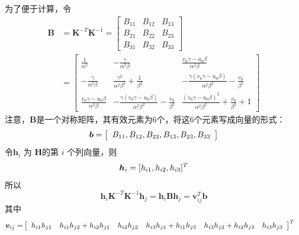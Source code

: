 为了便于计算，令
\begin{equation}
\label{eqn:2.55}
\begin{aligned}
\bm{B} &= \bm{K}^{-T}\bm{K}^{-1}
=\left[
\begin{array}{ccc}
B_{11} & B_{12} & B_{13} \\
B_{21} & B_{22} & B_{23} \\
B_{31} & B_{32} & B_{33}
\end{array}
\right]  \\
&=\left[
\begin{array}{ccc}
\frac{1}{\alpha^2} & -\frac{\gamma}{\alpha^2\beta} & \frac{v_0\gamma-u_0\beta}{\alpha^2\beta} \\
-\frac{\gamma}{\alpha^2\beta} & \frac{\gamma^2}{\alpha^2\beta^2}+\frac{1}{\beta^2} & -\frac{\gamma(v_0\gamma-u_0\beta)}{\alpha^2\beta^2}-\frac{v_0}{\beta^2} \\
\frac{v_0\gamma-u_0\beta}{\alpha^2\beta} & -\frac{\gamma(v_0\gamma-u_0\beta)}{\alpha^2\beta^2}-\frac{v_0}{\beta^2} & \frac{(v_0\gamma-u_0\beta)^2}{\alpha^2\beta^2}+\frac{v_0}{\beta^2}+1
\end{array}
\right]
\end{aligned}
\end{equation}
注意，$\bm{B}$是一个对称矩阵，其有效元素为6个，将这6个元素写成向量的形式：
\begin{equation}
\label{eqn:2.56}
\setlength{\abovedisplayskip}{6pt}
\setlength{\belowdisplayskip}{6pt}
\bm{b} =\left[\begin{array}{ccc}B_{11} ,B_{12} , B_{22},B_{13},B_{23},B_{33}\end{array}\right]
\end{equation}
令$\bm{h}_i $ 为 $\bm{H} $的第 $i$  个列向量，则 
\begin{equation}
\label{eqn:2.57}
\setlength{\abovedisplayskip}{6pt}
\setlength{\belowdisplayskip}{6pt}
\bm{h}_i = [h_{i1},h_{i2},h_{i3}]^T
\end{equation}
所以
\begin{equation}
\label{eqn:2.58}
\bm{h}_i \bm{K}^{-T}\bm{K}^{-1} \bm{h}_j = \bm{h}_i \bm{B} \bm{h}_j = \bm{v}_{ij}^T \bm{b}
\end{equation}
其中
\[
\setlength{\abovedisplayskip}{6pt}
\setlength{\belowdisplayskip}{6pt}
\begin{aligned}
\bm{v}_{ij} = 
& \left[ \begin{array}{cccccc} 
h_{i1}h_{j1} & h_{i1}h_{j2}+h_{i2}h_{j1} & h_{i2}h_{j2} & h_{i3}h_{j1}+h_{i1}h_{j3} & h_{i3}h_{j2}+h_{i2}h_{j3} & h_{i3}h_{j3} 
\end{array} \right]^T
\end{aligned}
\]

